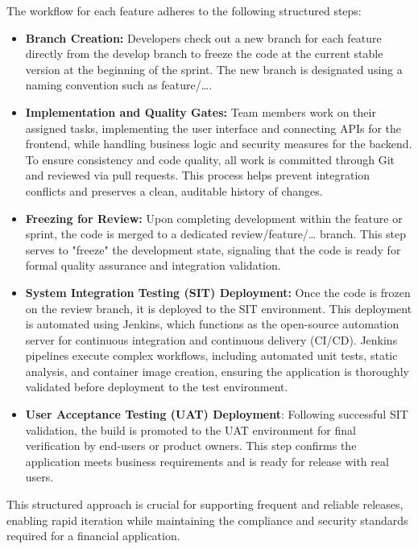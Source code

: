The workflow for each feature adheres to the following structured steps:

\begin{itemize}
\item
  \textbf{Branch Creation:} Developers check out a new branch for each
  feature directly from the develop branch to freeze the code at the
  current stable version at the beginning of the sprint. The new branch
  is designated using a naming convention such as feature/\ldots.
\item
  \textbf{Implementation and Quality Gates:} Team members work on their
  assigned tasks, implementing the user interface and connecting APIs
  for the frontend, while handling business logic and security measures
  for the backend. To ensure consistency and code quality, all work is
  committed through Git and reviewed via pull requests. This process
  helps prevent integration conflicts and preserves a clean, auditable
  history of changes.
\item
  \textbf{Freezing for Review:} Upon completing development within the
  feature or sprint, the code is merged to a dedicated
  review/feature/\ldots{} branch. This step serves to "freeze" the
  development state, signaling that the code is ready for formal quality
  assurance and integration validation.
\item
  \textbf{System Integration Testing (SIT) Deployment:} Once the code is
  frozen on the review branch, it is deployed to the SIT environment.
  This deployment is automated using Jenkins, which functions as the
  open-source automation server for continuous integration and
  continuous delivery (CI/CD). Jenkins pipelines execute complex
  workflows, including automated unit tests, static analysis, and
  container image creation, ensuring the application is thoroughly
  validated before deployment to the test environment.
\item
  \textbf{User Acceptance Testing (UAT) Deployment}: Following
  successful SIT validation, the build is promoted to the UAT
  environment for final verification by end-users or product owners.
  This step confirms the application meets business requirements and is
  ready for release with real users.
\end{itemize}

This structured approach is crucial for supporting frequent and reliable
releases, enabling rapid iteration while maintaining the compliance and
security standards required for a financial application.

